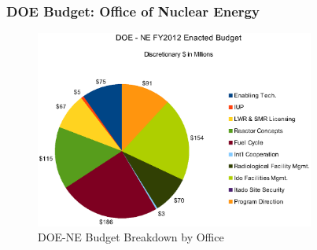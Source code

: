 \begin{frame}[ctb!]
  \frametitle{DOE Budget: Office of Nuclear Energy}
  \begin{figure}[htbp!]
    \begin{center}
      \includegraphics[height=6.5cm]{doe-ne.eps}
    \caption{DOE-NE Budget Breakdown by Office\cite{chu_2012}}
    \label{fig:doe-ne}
    \end{center}
  \end{figure}
\end{frame}
